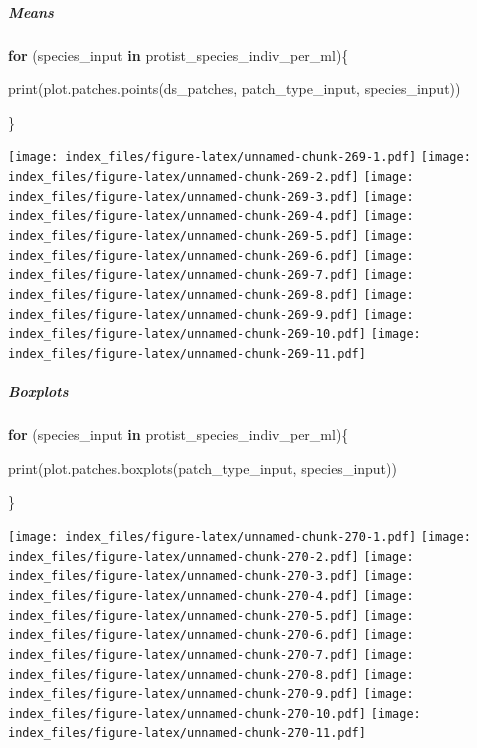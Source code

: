 \documentclass[
]{article}
\newenvironment{Shaded}{\begin{snugshade}}{\end{snugshade}}
\newcommand{\ControlFlowTok}[1]{\textcolor[rgb]{0.13,0.29,0.53}{\textbf{#1}}}
\newcommand{\FunctionTok}[1]{\textcolor[rgb]{0.00,0.00,0.00}{#1}}
\newcommand{\NormalTok}[1]{#1}
\begin{document}
\hypertarget{means-11}{%
\subparagraph{Means}\label{means-11}}

\begin{Shaded}
\begin{Highlighting}[]
\ControlFlowTok{for}\NormalTok{ (species\_input }\ControlFlowTok{in}\NormalTok{ protist\_species\_indiv\_per\_ml)\{}
  
  \FunctionTok{print}\NormalTok{(}\FunctionTok{plot.patches.points}\NormalTok{(ds\_patches, patch\_type\_input,}
\NormalTok{                              species\_input))}
  
\NormalTok{\}}
\end{Highlighting}
\end{Shaded}

\texttt{[image: index\_files/figure-latex/unnamed-chunk-269-1.pdf]}
\texttt{[image: index\_files/figure-latex/unnamed-chunk-269-2.pdf]}
\texttt{[image: index\_files/figure-latex/unnamed-chunk-269-3.pdf]}
\texttt{[image: index\_files/figure-latex/unnamed-chunk-269-4.pdf]}
\texttt{[image: index\_files/figure-latex/unnamed-chunk-269-5.pdf]}
\texttt{[image: index\_files/figure-latex/unnamed-chunk-269-6.pdf]}
\texttt{[image: index\_files/figure-latex/unnamed-chunk-269-7.pdf]}
\texttt{[image: index\_files/figure-latex/unnamed-chunk-269-8.pdf]}
\texttt{[image: index\_files/figure-latex/unnamed-chunk-269-9.pdf]}
\texttt{[image: index\_files/figure-latex/unnamed-chunk-269-10.pdf]}
\texttt{[image: index\_files/figure-latex/unnamed-chunk-269-11.pdf]}

\hypertarget{boxplots-11}{%
\subparagraph{Boxplots}\label{boxplots-11}}

\begin{Shaded}
\begin{Highlighting}[]
\ControlFlowTok{for}\NormalTok{ (species\_input }\ControlFlowTok{in}\NormalTok{ protist\_species\_indiv\_per\_ml)\{}
  
  \FunctionTok{print}\NormalTok{(}\FunctionTok{plot.patches.boxplots}\NormalTok{(patch\_type\_input,}
\NormalTok{                              species\_input))}
  
\NormalTok{\}}
\end{Highlighting}
\end{Shaded}

\texttt{[image: index\_files/figure-latex/unnamed-chunk-270-1.pdf]}
\texttt{[image: index\_files/figure-latex/unnamed-chunk-270-2.pdf]}
\texttt{[image: index\_files/figure-latex/unnamed-chunk-270-3.pdf]}
\texttt{[image: index\_files/figure-latex/unnamed-chunk-270-4.pdf]}
\texttt{[image: index\_files/figure-latex/unnamed-chunk-270-5.pdf]}
\texttt{[image: index\_files/figure-latex/unnamed-chunk-270-6.pdf]}
\texttt{[image: index\_files/figure-latex/unnamed-chunk-270-7.pdf]}
\texttt{[image: index\_files/figure-latex/unnamed-chunk-270-8.pdf]}
\texttt{[image: index\_files/figure-latex/unnamed-chunk-270-9.pdf]}
\texttt{[image: index\_files/figure-latex/unnamed-chunk-270-10.pdf]}
\texttt{[image: index\_files/figure-latex/unnamed-chunk-270-11.pdf]}
\end{document}
